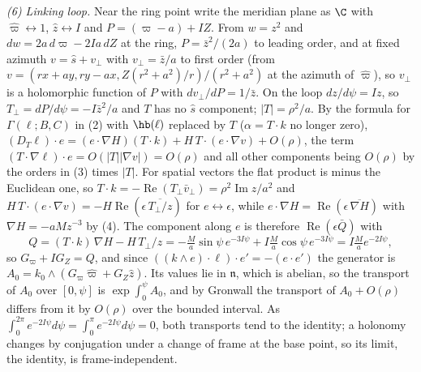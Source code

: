 \emph{(6) Linking loop.} Near the ring point write the meridian plane as $\C$ with $\hat\varpi \leftrightarrow 1$, $\hat z \leftrightarrow I$ and $P = (\varpi - a) + IZ$. From $w = z^2$ and $dw = 2a\,d\varpi - 2Ia\,dZ$ at the ring, $P = \bar z^2/(2a)$ to leading order, and at fixed azimuth $v = \hat s + v_\perp$ with $v_\perp = \bar z/a$ to first order (from $v = (rx + ay, ry - ax, Z(r^2 + a^2)/r)/(r^2 + a^2)$ at the azimuth of $\hat\varpi$), so $v_\perp$ is a holomorphic function of $P$ with $dv_\perp/dP = 1/\bar z$. On the loop $dz/d\psi = Iz$, so $T_\perp = dP/d\psi = -I\bar z^2/a$ and $T$ has no $\hat s$ component; $|T| = \rho^2/a$. By the formula for $\Gamma(\ell; B, C)$ in (2) with $\hb(\ell)$ replaced by $T$ ($\alpha = T \cdot k$ no longer zero), $(D_T \ell) \cdot e = (e \cdot \nabla H)(T \cdot k) + H\,T \cdot (e \cdot \nabla v) + O(\rho)$, the term $(T \cdot \nabla\ell) \cdot e = O(|T||\nabla v|) = O(\rho)$ and all other components being $O(\rho)$ by the orders in (3) times $|T|$. For spatial vectors the flat product is minus the Euclidean one, so $T \cdot k = -\operatorname{Re}(T_\perp\bar v_\perp) = \rho^2\operatorname{Im}z/a^2$ and $H\,T \cdot (e \cdot \nabla v) = -H\operatorname{Re}(\epsilon\,\overline{T_\perp/z})$ for $e \leftrightarrow \epsilon$, while $e \cdot \nabla H = \operatorname{Re}(\epsilon\,\overline{\nabla H})$ with $\nabla H = -aMz^{-3}$ by (4). The component along $e$ is therefore $\operatorname{Re}(\epsilon\bar Q)$ with
\[
Q = (T \cdot k)\,\nabla H - H\,T_\perp/z = -\tfrac{M}{a}\sin\psi\,e^{-3I\psi} + I\tfrac{M}{a}\cos\psi\,e^{-3I\psi} = I\tfrac{M}{a}e^{-2I\psi},
\]
so $G_\varpi + IG_Z = Q$, and since $((k \wedge e) \cdot \ell) \cdot e' = -(e \cdot e')$ the generator is $A_0 = k_0 \wedge (G_\varpi\hat\varpi + G_Z\hat z)$. Its values lie in $\mathfrak n$, which is abelian, so the transport of $A_0$ over $[0, \psi]$ is $\exp\int_0^\psi A_0$, and by Gronwall the transport of $A_0 + O(\rho)$ differs from it by $O(\rho)$ over the bounded interval. As $\int_0^{2\pi}e^{-2I\psi}d\psi = \int_0^{\pi}e^{-2I\psi}d\psi = 0$, both transports tend to the identity; a holonomy changes by conjugation under a change of frame at the base point, so its limit, the identity, is frame-independent.

